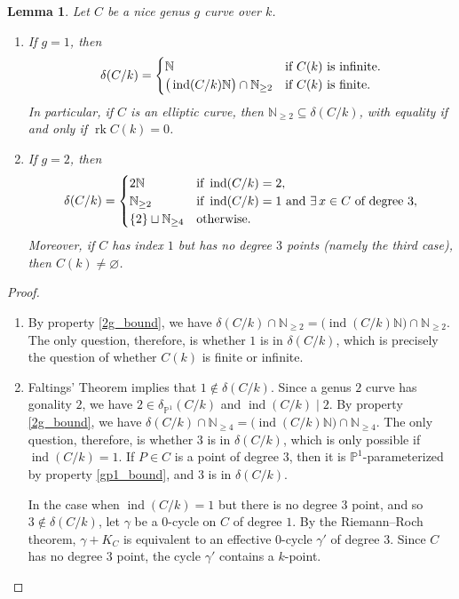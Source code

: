 \documentclass[a4paper,11pt]{amsart}
\theoremstyle{plain}
\newtheorem{lemma}[thm]{Lemma}
\theoremstyle{remark}
\newcommand{\nn}{\mathbb{N}}
\newcommand{\rk}{\operatorname{rk}}
\newcommand{\dendegs}{\delta}
\newcommand{\ind}{\operatorname{ind}}
\begin{document}
\begin{lemma}\label{lemma:deltagenus2}
Let $C$ be a nice genus $g$ curve over $k$.
\begin{enumerate}
    \item If \(g=1\), then
    \[\dendegs(C/k) = \begin{cases}
        \nn & \textup{if \(C(k)\) is infinite.}\\
        \big(\ind(C/k) \nn \big) \cap \nn_{\geq 2} & \textup{if \(C(k)\) is finite.} 
    \end{cases}\]
    In particular, if \(C\) is an elliptic curve, then \(\nn_{\geq 2} \subseteq \dendegs(C/k)\), with equality if and only if \(\rk C(k) = 0\).
    
\item If \(g=2\), then   
    \[
        \dendegs(C/k) = 
        \begin{cases} 
        2\nn & \textup{if}\  \ind(C/k) = 2, \\
        \nn_{\geq 2} &  \textup{if}\  \ind(C/k) = 1\ \textup{and}\ \exists\, x\in C \ \textup{of degree}\ 3, \\
        \{2\} \sqcup \nn_{\geq 4} & \textup{otherwise}.
        \end{cases}
        \]
        Moreover, if $C$ has index $1$ but has no degree $3$ points (namely the third case), then $C(k)\neq \varnothing$.
        \end{enumerate}
\end{lemma}

\begin{proof} \hfill
\begin{enumerate}
    \item By property \eqref{2g_bound}, we have \(\dendegs(C/k) \cap \nn_{\geq 2} = \big(\ind(C/k)\nn\big) \cap \nn_{\geq 2}\).  The only question, therefore, is whether \(1\) is in \(\dendegs(C/k)\), which is precisely the question of whether \(C(k)\) is finite or infinite.
    \item Faltings' Theorem implies that \(1 \not\in \dendegs(C/k)\).  Since a genus \(2\) curve has gonality \(2\), we have \(2 \in \dendegs_{\mathbb{P}^1}(C/k)\) and \(\ind(C/k)\mid 2\).  By property \eqref{2g_bound}, we have \(\dendegs(C/k) \cap \nn_{\geq 4} = \big(\ind(C/k)\nn\big) \cap \nn_{\geq 4}\).  The only question, therefore, is whether \(3\) is in \(\dendegs(C/k)\), which is only possible if \(\ind(C/k)=1\). 
    If $P\in C$ is a point of degree $3$, then it is \(\mathbb{P}^1\)-parameterized by property \eqref{gp1_bound}, and $3$ is in $\dendegs(C/k)$.

    In the case when $\ind(C/k) =1$ but there is no degree $3$ point, and so \(3 \not\in \dendegs(C/k)\), let $\gamma$ be a $0$-cycle on $C$ of degree $1$. 
    By the Riemann--Roch theorem, $\gamma + K_C$ is equivalent to an effective $0$-cycle $\gamma'$ of degree $3$. Since $C$ has no degree $3$ point, the cycle $\gamma'$ contains a $k$-point. \qedhere
\end{enumerate}
\end{proof}
\end{document}
